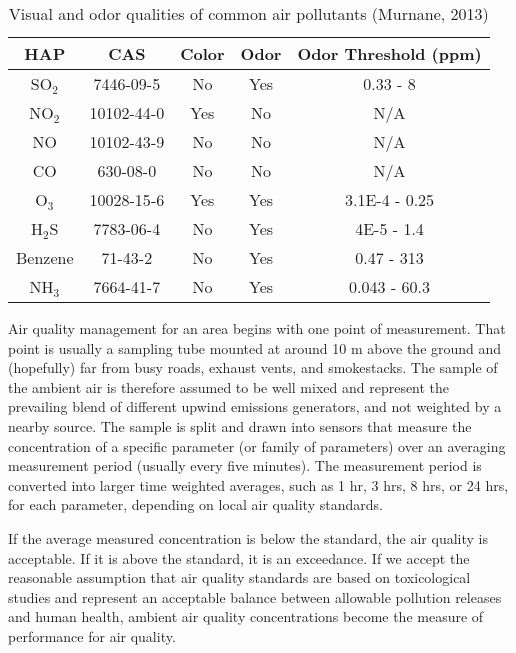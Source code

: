 \begin{table}[H]
\centering
\caption[Visual and odor qualities of common air pollutants]{Visual and odor qualities of common air pollutants (Murnane, 2013)}
\label{tb:odor}
\begin{tabular}{@{}ccccc@{}}
\toprule
\textbf{HAP} & \textbf{CAS} & \textbf{Color} & \textbf{Odor} & \textbf{Odor Threshold (ppm)} \\ \midrule
SO$_{2}$ & 7446-09-5 & No & Yes & 0.33 - 8 \\
NO$_{2}$ & 10102-44-0 & Yes & No & N/A \\
NO & 10102-43-9 & No & No & N/A \\
CO & 630-08-0 & No & No & N/A \\
O$_{3}$ & 10028-15-6 & Yes & Yes & 3.1E-4 - 0.25 \\
H$_{2}$S & 7783-06-4 & No & Yes & 4E-5 - 1.4 \\
Benzene & 71-43-2 & No & Yes & 0.47 - 313 \\
NH$_{3}$ & 7664-41-7 & No & Yes & 0.043 - 60.3 \\ \bottomrule
\end{tabular}
\end{table}

Air quality management for an area begins with one point of measurement. That point is usually a sampling tube mounted at around 10 m above the ground and (hopefully) far from busy roads, exhaust vents, and smokestacks. The sample of the ambient air is therefore assumed to be well mixed and represent the prevailing blend of different upwind emissions generators, and not weighted by a nearby source. The sample is split and drawn into sensors that measure the concentration of a specific parameter (or family of parameters) over an averaging measurement period (usually every five minutes). The measurement period is converted into larger time weighted averages, such as 1 hr, 3 hrs, 8 hrs, or 24 hrs, for each parameter, depending on local air quality standards. 

If the average measured concentration is below the standard, the air quality is acceptable. If it is above the standard, it is an exceedance. If we accept the reasonable assumption that air quality standards are based on toxicological studies and represent an acceptable balance between allowable pollution releases and human health, ambient air quality concentrations become the measure of performance for air quality.

